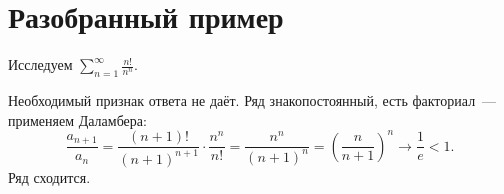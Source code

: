 \documentclass[12pt, a4paper]{article}
\begin{document}
\section*{Разобранный пример}

Исследуем $\displaystyle\sum_{n=1}^{\infty} \frac{n!}{n^n}$.

Необходимый признак ответа не даёт. Ряд знакопостоянный, есть факториал~---
применяем Даламбера:
\[
\frac{a_{n+1}}{a_n} = \frac{(n+1)!}{(n+1)^{n+1}}\cdot\frac{n^n}{n!}
= \frac{n^n}{(n+1)^n} = \left(\frac{n}{n+1}\right)^{n} \to \frac{1}{e} < 1.
\]
Ряд сходится.
\end{document}
